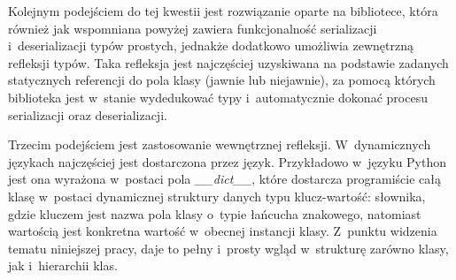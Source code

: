 \documentclass[12pt]{article}
\newcommand{\n}{\newline}
\newcommand{\code}[1]{{\it #1}}
\begin{document}
{		Kolejnym podejściem do tej kwestii jest rozwiązanie oparte na bibliotece, która również jak wspomniana powyżej zawiera funkcjonalność
		serializacji i~deserializacji typów prostych, jednakże dodatkowo umożliwia zewnętrzną refleksji typów.
		Taka refleksja jest najczęściej uzyskiwana na podstawie zadanych statycznych referencji do pola klasy (jawnie lub niejawnie), za
		pomocą których biblioteka jest w~stanie wydedukować typy i~automatycznie dokonać procesu serializacji oraz deserializacji.\n

		Trzecim podejściem jest zastosowanie wewnętrznej refleksji. W~dynamicznych językach najczęściej jest dostarczona przez język.
		Przykładowo w~języku Python jest ona wyrażona w~postaci pola \code{\_\_dict\_\_}, które dostarcza programiście całą klasę
		w~postaci dynamicznej struktury danych typu klucz-wartość: słownika, gdzie kluczem jest nazwa pola klasy o~typie
		łańcucha znakowego, natomiast wartością jest konkretna wartość w~obecnej instancji klasy. Z~punktu widzenia tematu
		niniejszej pracy, daje to pełny i~prosty wgląd w~strukturę zarówno klasy, jak i~hierarchii klas.
	}
\end{document}
